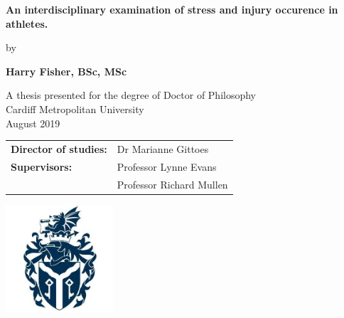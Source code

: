 \documentclass[
  english,
  man,floatsintext]{apa6}
\author{\textsuperscript{}}
\affiliation{
\vspace{0.5cm}
 }
\date{}
\begin{document}
\clearpage\mbox{}\thispagestyle{empty}\clearpage
\setcounter{page}{1}

\thispagestyle{empty}
    \begin{center}
        \vspace*{0.5cm}
 
        \Large
        \textbf{An interdisciplinary examination of stress and injury occurence in athletes.}
 
        \vspace{0.3cm}
        \large
        
        by
 
        \vspace{0.3cm}
        \Large
        \textbf{Harry Fisher, BSc, MSc}
 
        \vspace{0.3cm}
 
        A thesis presented for the degree of Doctor of Philosophy\\
        Cardiff Metropolitan University\\
        August 2019\\
        
        \vspace{1cm}
                
        \begin{tabular}{ll}
         \textbf{Director of studies:} & Dr Marianne Gittoes\\
         \textbf{Supervisors:} & Professor Lynne Evans\\
         & Professor Richard Mullen\\
         \end{tabular}
        
        \vspace{1cm}
                                  
        \includegraphics[width=0.3\textwidth]{figs/cardiffmetlogo}
 
\end{center}

\clearpage

\setcounter{page}{1}
\end{document}
